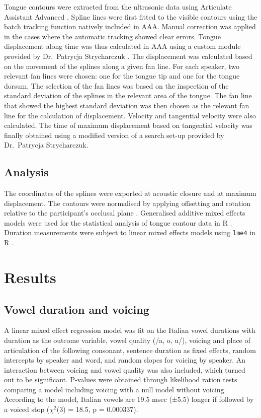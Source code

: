\documentclass[authoryear]{elsarticle}
\begin{document}
Tongue contours were extracted from the ultrasonic data using Articulate
Assistant Advanced \citep[AAA,][]{articulate2011}. Spline lines were
first fitted to the visible contours using the batch tracking function
natively included in AAA. Manual correction was applied in the cases
where the automatic tracking showed clear errors. Tongue displacement
along time was thus calculated in AAA using a custom module provided by
Dr.~Patrycja Strycharczuk \citep{Strycharczuk2015}. The displacement was
calculated based on the movement of the splines along a given fan line.
For each speaker, two relevant fan lines were chosen: one for the tongue
tip and one for the tongue dorsum. The selection of the fan lines was
based on the inspection of the standard deviation of the splines in the
relevant area of the tongue. The fan line that showed the highest
standard deviation was then chosen as the relevant fan line for the
calculation of displacement. Velocity and tangential velocity were also
calculated. The time of maximum displacement based on tangential
velocity was finally obtained using a modified version of a search
set-up provided by Dr.~Patrycja Strycharczuk.

\subsection{Analysis}\label{analysis}

The coordinates of the splines were exported at acoustic closure and at
maximum displacement. The contours were normalised by applying
offsetting and rotation relative to the participant's occlusal plane
\citep{scobbie2011}. Generalised additive mixed effects models
\citep{wood2006} were used for the statistical analysis of tongue
contour data in R \citep{r-core-team2017}. Duration measurements were
subject to linear mixed effects models using \texttt{lme4} in R
\citep{bates2015}.

\section{Results}\label{results}

\subsection{Vowel duration and
voicing}\label{vowel-duration-and-voicing}

A linear mixed effect regression model was fit on the Italian vowel
durations with duration as the outcome variable, vowel quality (/a, o,
u/), voicing and place of articulation of the following consonant,
sentence duration as fixed effects, random intercepts by speaker and
word, and random slopes for voicing by speaker. An interaction between
voicing and vowel quality was also included, which turned out to be
significant. P-values were obtained through likelihood ration tests
comparing a model including voicing with a null model without voicing.
According to the model, Italian vowels are 19.5 msec (±5.5) longer if
followed by a voiced stop (\(\chi^2\)(3) = 18.5, p = 0.000337).
\end{document}
